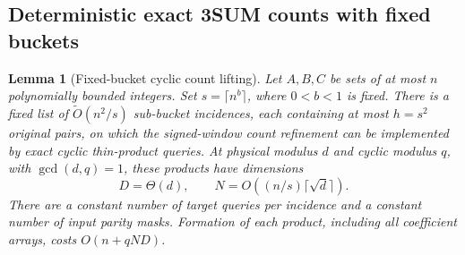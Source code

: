 \documentclass[11pt]{article}
\newtheorem{lemma}[theorem]{Lemma}
\newcommand{\softO}{\widetilde O}
\begin{document}
\subsection{Deterministic exact 3SUM counts with fixed buckets}
\label{sec:deterministic-cyclic-3sum}

\begin{lemma}[Fixed-bucket cyclic count lifting]
\label{lem:fixed-bucket-cyclic-counting}
Let $A,B,C$ be sets of at most $n$ polynomially bounded integers.
Set $s=\lceil n^b\rceil$, where $0<b<1$ is fixed.  There is a fixed
list of $\softO(n^2/s)$ sub-bucket incidences, each containing at most
$h=s^2$ original pairs, on which the signed-window count refinement
can be implemented by exact cyclic thin-product queries.  At physical
modulus $d$ and cyclic modulus $q$, with $\gcd(d,q)=1$, these products
have dimensions
\[
 D=\Theta(d),\qquad N=O((n/s)\lceil\sqrt d\rceil).
\]
There are a constant number of target queries per incidence and a
constant number of input parity masks.  Formation of each product,
including all coefficient arrays, costs $O(n+qND)$.
\end{lemma}
\end{document}
